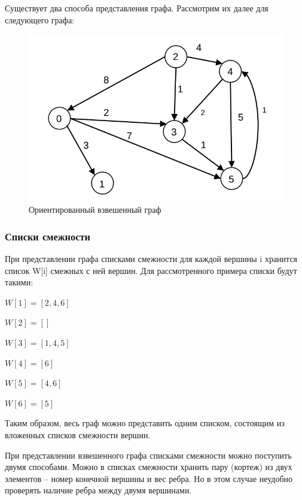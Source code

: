 Существует два способа представления графа. Рассмотрим их далее для следующего графа:

\begin{figure}[H]
	\begin{center}
		\includegraphics[scale=0.5]{img/graph.png}
	\end{center}
	\captionsetup{justification=centering}
	\caption{Ориентированный взвешенный граф}
	\label{img:graph}
\end{figure}

\subsubsection{Списки смежности}

При представлении графа списками смежности для каждой вершины i хранится список W[i] смежных с ней вершин. Для рассмотренного примера списки будут такими:

\clearpage

$W[1] = [2, 4, 6]$

$W[2] = [ ]$

$W[3] = [1, 4, 5]$

$W[4] = [6]$

$W[5] = [4, 6]$

$W[6] = [5]$

Таким образом, весь граф можно представить одним списком, состоящим из вложенных списков смежности вершин.

При представлении взвешенного графа списками смежности можно поступить двумя способами. Можно в списках смежности хранить пару (кортеж) из двух элементов – номер конечной вершины и вес ребра. Но в этом случае неудобно проверять наличие ребра между двумя вершинами.

